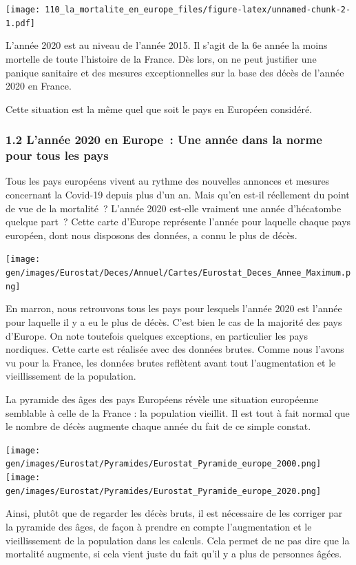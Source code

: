 \documentclass[
]{article}
\begin{document}
\texttt{[image: 110\_la\_mortalite\_en\_europe\_files/figure-latex/unnamed-chunk-2-1.pdf]}

L'année 2020 est au niveau de l'année 2015. Il s'agit de la 6e année la
moins mortelle de toute l'histoire de la France. Dès lors, on ne peut
justifier une panique sanitaire et des mesures exceptionnelles sur la
base des décès de l'année 2020 en France.

Cette situation est la même quel que soit le pays en Européen considéré.

\hypertarget{lannuxe9e-2020-en-europe-une-annuxe9e-dans-la-norme-pour-tous-les-pays}{%
\subsubsection{1.2 L'année 2020 en Europe~: Une année dans la norme pour
tous les
pays}\label{lannuxe9e-2020-en-europe-une-annuxe9e-dans-la-norme-pour-tous-les-pays}}

Tous les pays européens vivent au rythme des nouvelles annonces et
mesures concernant la Covid-19 depuis plus d'un an. Mais qu'en est-il
réellement du point de vue de la mortalité~? L'année 2020 est-elle
vraiment une année d'hécatombe quelque part~? Cette carte d'Europe
représente l'année pour laquelle chaque pays européen, dont nous
disposons des données, a connu le plus de décès.

\texttt{[image: gen/images/Eurostat/Deces/Annuel/Cartes/Eurostat\_Deces\_Annee\_Maximum.png]}

En marron, nous retrouvons tous les pays pour lesquels l'année 2020 est
l'année pour laquelle il y a eu le plus de décès. C'est bien le cas de
la majorité des pays d'Europe. On note toutefois quelques exceptions, en
particulier les pays nordiques. Cette carte est réalisée avec des
données brutes. Comme nous l'avons vu pour la France, les données brutes
reflètent avant tout l'augmentation et le vieillissement de la
population.

La pyramide des âges des pays Européens révèle une situation européenne
semblable à celle de la France : la population vieillit. Il est tout à
fait normal que le nombre de décès augmente chaque année du fait de ce
simple constat.

\texttt{[image: gen/images/Eurostat/Pyramides/Eurostat\_Pyramide\_europe\_2000.png]}
\texttt{[image: gen/images/Eurostat/Pyramides/Eurostat\_Pyramide\_europe\_2020.png]}

Ainsi, plutôt que de regarder les décès bruts, il est nécessaire de les
corriger par la pyramide des âges, de façon à prendre en compte
l'augmentation et le vieillissement de la population dans les calculs.
Cela permet de ne pas dire que la mortalité augmente, si cela vient
juste du fait qu'il y a plus de personnes âgées.
\end{document}
